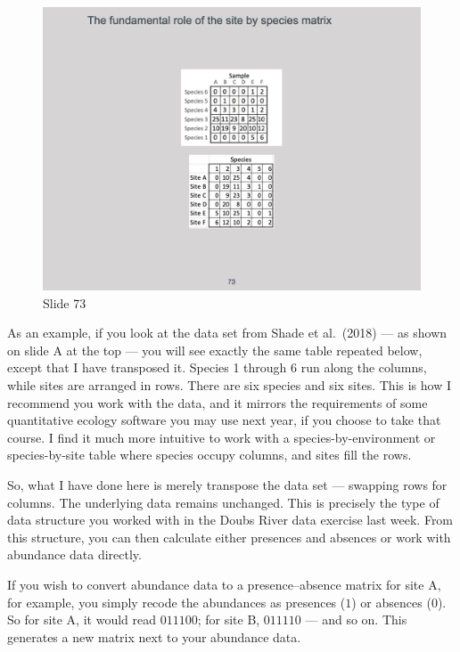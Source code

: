 \documentclass[
  12pt,
]{book}
\begin{document}
\begin{figure}[ht]
\centering
\includegraphics[width=0.8\linewidth]{../images/BDC334/BDC334-073.jpeg}
\caption*{Slide 73}
\end{figure}

As an example, if you look at the data set from Shade et al.~(2018) ---
as shown on slide A at the top --- you will see exactly the same table
repeated below, except that I have transposed it. Species 1 through 6
run along the columns, while sites are arranged in rows. There are six
species and six sites. This is how I recommend you work with the data,
and it mirrors the requirements of some quantitative ecology software
you may use next year, if you choose to take that course. I find it much
more intuitive to work with a species-by-environment or species-by-site
table where species occupy columns, and sites fill the rows.

So, what I have done here is merely transpose the data set --- swapping
rows for columns. The underlying data remains unchanged. This is
precisely the type of data structure you worked with in the Doubs River
data exercise last week. From this structure, you can then calculate
either presences and absences or work with abundance data directly.

If you wish to convert abundance data to a presence--absence matrix for
site A, for example, you simply recode the abundances as presences
(\(1\)) or absences (\(0\)). So for site A, it would read \(011100\);
for site B, \(011110\) --- and so on. This generates a new matrix next
to your abundance data.
\end{document}
